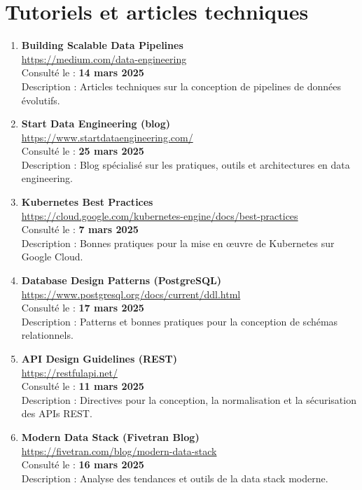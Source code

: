 \section*{Tutoriels et articles techniques}
\begin{enumerate}
    \item \textbf{Building Scalable Data Pipelines} \\
    \url{https://medium.com/data-engineering} \\
    Consulté le : \textbf{14 mars 2025} \\
    Description : Articles techniques sur la conception de pipelines de données évolutifs.

    \item \textbf{Start Data Engineering (blog)} \\
    \url{https://www.startdataengineering.com/} \\
    Consulté le : \textbf{25 mars 2025} \\
    Description : Blog spécialisé sur les pratiques, outils et architectures en data engineering.

    \item \textbf{Kubernetes Best Practices} \\
    \url{https://cloud.google.com/kubernetes-engine/docs/best-practices} \\
    Consulté le : \textbf{7 mars 2025} \\
    Description : Bonnes pratiques pour la mise en œuvre de Kubernetes sur Google Cloud.

    \item \textbf{Database Design Patterns (PostgreSQL)} \\
    \url{https://www.postgresql.org/docs/current/ddl.html} \\
    Consulté le : \textbf{17 mars 2025} \\
    Description : Patterns et bonnes pratiques pour la conception de schémas relationnels.

    \item \textbf{API Design Guidelines (REST)} \\
    \url{https://restfulapi.net/} \\
    Consulté le : \textbf{11 mars 2025} \\
    Description : Directives pour la conception, la normalisation et la sécurisation des APIs REST.

    \item \textbf{Modern Data Stack (Fivetran Blog)} \\
    \url{https://fivetran.com/blog/modern-data-stack} \\
    Consulté le : \textbf{16 mars 2025} \\
    Description : Analyse des tendances et outils de la data stack moderne.


\end{enumerate}
